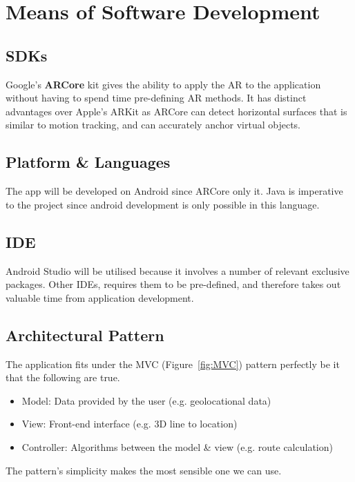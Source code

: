 
\section{Means of Software Development}

\subsection*{SDKs}
Google's \textbf{ARCore} kit gives the ability to apply the AR to the application without having to spend time pre-defining AR methods. It has distinct advantages over Apple's ARKit as ARCore can detect horizontal surfaces that is similar to motion tracking, and can accurately anchor virtual objects. \cite{newgenapps}

\subsection*{Platform \& Languages}
The app will be developed on Android since ARCore only it. Java is imperative to the project since android development is only possible in this language.

\subsection*{IDE}
Android Studio will be utilised because it involves a number of relevant exclusive packages. Other IDEs, requires them to be pre-defined, and therefore takes out valuable time from application development.

\subsection*{Architectural Pattern}
The application fits under the MVC (Figure~\ref{fig:MVC}) pattern perfectly be it that the following are true.
\begin{itemize}
    \item Model: Data provided by the user (e.g. geolocational data)
    \item View: Front-end interface (e.g. 3D line to location)
    \item Controller: Algorithms between the model \& view (e.g. route calculation)
\end{itemize}
The pattern's simplicity makes the most sensible one we can use.

